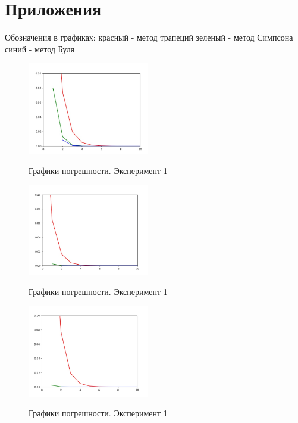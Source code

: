 \documentclass[14pt, titlepage, a4paper]{extarticle} %
\begin{document}
	
	\section*{Приложения}
	
	Обозначения в графиках:
	красный - метод трапеций
	зеленый - метод Симпсона
	синий - метод Буля
	
	\begin{figure}[h]
		\centering
		\includegraphics[width=150pt]{gr1.jpeg}
		\label{gr1}
		\caption{Графики погрешности. Эксперимент 1}
	\end{figure}
	
	\begin{figure}[h]
		\centering
		\includegraphics[width=150pt]{gr2.jpeg}
		\label{gr2}
		\caption{Графики погрешности. Эксперимент 1}
	\end{figure}

	\begin{figure}[h]
		\centering
		\includegraphics[width=150pt]{gr3.jpeg}
		\label{gr3}
		\caption{Графики погрешности. Эксперимент 1}
	\end{figure}
	
\end{document}
